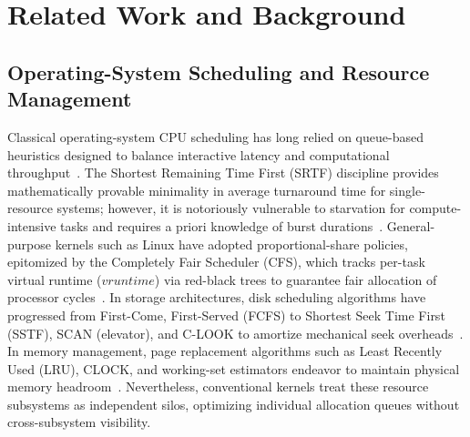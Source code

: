 \documentclass[conference]{IEEEtran}
\begin{document}
\section{Related Work and Background}
\label{sec:related_work}

\subsection{Operating-System Scheduling and Resource Management}
Classical operating-system CPU scheduling has long relied on queue-based heuristics designed to balance interactive latency and computational throughput~\cite{silberschatz2018operating}. The Shortest Remaining Time First (SRTF) discipline provides mathematically provable minimality in average turnaround time for single-resource systems; however, it is notoriously vulnerable to starvation for compute-intensive tasks and requires a priori knowledge of burst durations~\cite{tanenbaum2015modern}. General-purpose kernels such as Linux have adopted proportional-share policies, epitomized by the Completely Fair Scheduler (CFS), which tracks per-task virtual runtime ($vruntime$) via red-black trees to guarantee fair allocation of processor cycles~\cite{arpacidusseau2018operating}. In storage architectures, disk scheduling algorithms have progressed from First-Come, First-Served (FCFS) to Shortest Seek Time First (SSTF), SCAN (elevator), and C-LOOK to amortize mechanical seek overheads~\cite{silberschatz2018operating}. In memory management, page replacement algorithms such as Least Recently Used (LRU), CLOCK, and working-set estimators endeavor to maintain physical memory headroom~\cite{tanenbaum2015modern}. Nevertheless, conventional kernels treat these resource subsystems as independent silos, optimizing individual allocation queues without cross-subsystem visibility.
\end{document}
